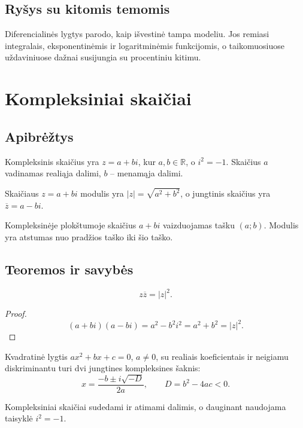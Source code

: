 \subsection{Ryšys su kitomis temomis}
Diferencialinės lygtys parodo, kaip išvestinė tampa modeliu. Jos remiasi integralais, eksponentinėmis ir logaritminėmis funkcijomis, o taikomuosiuose uždaviniuose dažnai susijungia su procentiniu kitimu.

\section{Kompleksiniai skaičiai}\label{sec:kompleksiniai-skaiciai}

\subsection{Apibrėžtys}
\begin{apibreztis}
Kompleksinis skaičius yra \(z=a+bi\), kur \(a,b\in\mathbb{R}\), o \(i^2=-1\). Skaičius \(a\) vadinamas realiąja dalimi, \(b\) -- menamąja dalimi.
\end{apibreztis}
\begin{apibreztis}
Skaičiaus \(z=a+bi\) modulis yra \(|z|=\sqrt{a^2+b^2}\), o jungtinis skaičius yra \(\overline z=a-bi\).
\end{apibreztis}
\begin{apibreztis}
Kompleksinėje plokštumoje skaičius \(a+bi\) vaizduojamas tašku \((a;b)\). Modulis yra atstumas nuo pradžios taško iki šio taško.
\end{apibreztis}

\subsection{Teoremos ir savybės}
\begin{savybe}
\[
z\overline z=|z|^2.
\]
\end{savybe}
\begin{proof}
\[
(a+bi)(a-bi)=a^2-b^2i^2=a^2+b^2=|z|^2.
\]
\end{proof}
\begin{teorema}
Kvadratinė lygtis \(ax^2+bx+c=0\), \(a\ne0\), su realiais koeficientais ir neigiamu diskriminantu turi dvi jungtines kompleksines šaknis:
\[
x=\frac{-b\pm i\sqrt{-D}}{2a},\qquad D=b^2-4ac<0.
\]
\end{teorema}
\begin{savybe}
Kompleksiniai skaičiai sudedami ir atimami dalimis, o dauginant naudojama taisyklė \(i^2=-1\).
\end{savybe}

